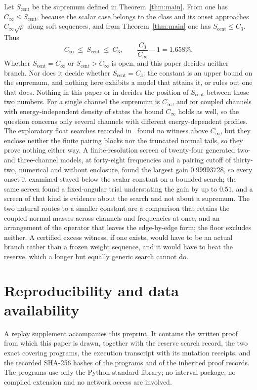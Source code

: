 \documentclass[10pt]{article}
\theoremstyle{remark}
\newcommand{\Cinf}{C_\infty}
\newcommand{\Cthree}{C_{3}}
\begin{document}
Let $S_{\mathrm{cent}}$ be the supremum defined in Theorem~\ref{thm:main}. From \cite{finite,predecessor} one has $\Cinf\le S_{\mathrm{cent}}$, because the scalar case belongs to the class and its onset approaches $\Cinf\sqrt\rho$ along soft sequences, and from Theorem~\ref{thm:main} one has $S_{\mathrm{cent}}\le\Cthree$. Thus
\[
\Cinf\ \le\ S_{\mathrm{cent}}\ \le\ \Cthree,\qquad \frac{\Cthree}{\Cinf}-1=1.658\% .
\]
Whether $S_{\mathrm{cent}}=\Cinf$ or $S_{\mathrm{cent}}>\Cinf$ is open, and this paper decides neither branch. Nor does it decide whether $S_{\mathrm{cent}}=\Cthree$: the constant is an upper bound on the supremum, and nothing here exhibits a model that attains it, or rules out one that does. Nothing in this paper or in \cite{predecessor,optimum,finiteenergy} decides the position of $S_{\mathrm{cent}}$ between those two numbers. For a single channel the supremum is $\Cinf$, and for coupled channels with energy-independent density of states the bound $\Cinf$ holds as well, so the question concerns only several channels with different energy-dependent profiles. The exploratory float searches recorded in~\cite{finiteenergy} found no witness above $\Cinf$, but they enclose neither the finite pairing blocks nor the truncated normal tails, so they prove nothing either way. A finite-resolution screen of twenty-four generated two- and three-channel models, at forty-eight frequencies and a pairing cutoff of thirty-two, numerical and without enclosure, found the largest gain $0.99993728$, so every onset it examined stayed below the scalar constant on a bounded search; the same screen found a fixed-angular trial understating the gain by up to $0.51$, and a screen of that kind is evidence about the search and not about a supremum. The two natural routes to a smaller constant are a comparison that retains the coupled normal masses across channels and frequencies at once, and an arrangement of the operator that leaves the edge-by-edge form; the floor excludes neither. A certified excess witness, if one exists, would have to be an actual branch rather than a frozen weight sequence, and it would have to beat the reserve, which a longer but equally generic search cannot do.

\section{Reproducibility and data availability}\label{sec:repro}

A replay supplement accompanies this preprint. It contains the written proof from which this paper is drawn, together with the reserve search record, the two exact covering programs, the execution transcript with its mutation receipts, and the recorded SHA-256 hashes of the programs and of the inherited proof records. The programs use only the Python standard library; no interval package, no compiled extension and no network access are involved.
\end{document}
